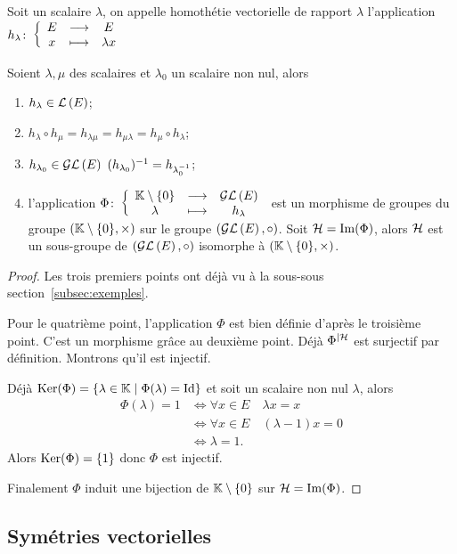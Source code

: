 \begin{defdef}
  Soit un scalaire \(\lambda\), on appelle homothétie vectorielle de rapport
  \(\lambda\) l'application \(h_\lambda\colon\left\{\begin{array}{ccc}E & \longrightarrow &E\\x & \longmapsto & \lambda x\end{array}\right.\)
\end{defdef}

\begin{prop}
  Soient \(\lambda, \mu\) des scalaires et \(\lambda_0\) un scalaire non nul,
  alors
  \begin{enumerate}
    \item \(h_\lambda \in \mathcal{L}\left(E\right)\);
    \item \(h_\lambda \circ h_\mu = h_{\lambda \mu} = h_{\mu \lambda} = h_\mu
      \circ h_\lambda\);
    \item \(h_{\lambda_0} \in \mathcal{GL}\left(E\right) \
      (h_{\lambda_0})^{-1}=h_{\lambda_0^{-1}}\);
    \item l'application
      \(\Phi\colon\left\{\begin{array}{ccc}\mathbb{K}\setminus\{0\} & \longrightarrow &\mathcal{GL}\left(E\right)\\\lambda & \longmapsto & h_\lambda\end{array}\right.\) est un
      morphisme de groupes du groupe \((\mathbb{K}\setminus\{0\}, \times)\) sur le
      groupe \((\mathcal{GL}\left(E\right), \circ)\). Soit \(\mathcal{H}=\operatorname{Im}(\Phi)\), alors \(\mathcal{H}\) est un
      sous-groupe de \((\mathcal{GL}\left(E\right), \circ)\) isomorphe à \((\mathbb{K}\setminus\{0\},
      \times)\).
  \end{enumerate}

\end{prop}

\begin{proof}
  Les trois premiers points ont déjà vu à la sous-sous section~\ref{subsec:exemples}.

  Pour le quatrième point, l'application \(\Phi\) est bien définie d'après le
  troisième point. C'est un morphisme grâce au deuxième point. Déjà
  \(\Phi^{|\mathcal{H}{}}\) est surjectif par définition. Montrons qu'il est injectif.

  Déjà \(\operatorname{Ker}(\Phi)=\left\{\lambda \in \mathbb{K}\mathrel{}\middle|\mathrel{}\Phi(\lambda)=\operatorname{Id}\right\}\) et soit un
  scalaire non nul \(\lambda\), alors
  \begin{align}
    \Phi(\lambda) = 1 &\iff \forall x \in E \quad \lambda x=x\\
    &\iff \forall x \in E \quad (\lambda-1)x=0\\
    &\iff \lambda=1.
  \end{align}
  Alors  \(\operatorname{Ker}(\Phi)=\{1\}\) donc \(\Phi\) est injectif.

  Finalement \(\Phi\) induit une bijection de \(\mathbb{K}\setminus\{0\}\) sur
  \(\mathcal{H}=\operatorname{Im}(\Phi)\).
\end{proof}

\subsection{Symétries vectorielles}

